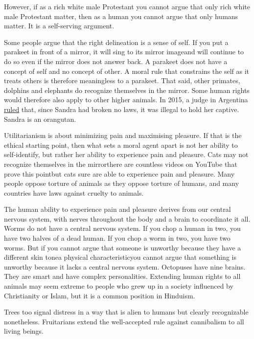 However, if as a rich white male Protestant you cannot argue that only rich white male Protestant matter, then as a human you cannot argue that only humans matter. It is a self-serving argument.

Some people argue that the right delineation is a sense of self. If you put a parakeet in front of a mirror, it will sing to its mirror image\textemdash and will continue to do so even if the mirror does not answer back. A parakeet does not have a concept of self and no concept of other. A moral rule that constrains the self as it treats others is therefore meaningless to a parakeet. That said, other primates, dolphins and elephants do recognize themselves in the mirror. Some human rights would therefore also apply to other higher animals. In 2015, a judge in Argentina \href{https://edition.cnn.com/2014/12/23/world/americas/feat-orangutan-rights-ruling/}{ruled} that, since Sandra had broken no laws, it was illegal to hold her captive. Sandra is an orangutan.

Utilitarianism is about minimizing pain and maximising pleasure. If that is the ethical starting point, then what sets a moral agent apart is not her ability to self-identify, but rather her ability to experience pain and pleasure. Cats may not recognize themselves in the mirror\textemdash there are countless videos on YouTube that prove this point\textemdash but cats sure are able to experience pain and pleasure. Many people oppose torture of animals as they oppose torture of humans, and many countries have laws against cruelty to animals.

The human ability to experience pain and pleasure derives from our central nervous system, with nerves throughout the body and a brain to coordinate it all. Worms do not have a central nervous system. If you chop a human in two, you have two halves of a dead human. If you chop a worm in two, you have two worms. But if you cannot argue that someone is unworthy because they have a different skin tone\textemdash a physical characteristic\textemdash you cannot argue that something is unworthy because it lacks a central nervous system. Octopuses have nine brains. They are smart and have complex personalities. Extending human rights to all animals may seem extreme to people who grew up in a society influenced by Christianity or Islam, but it is a common position in Hinduism.

Trees too signal distress in a way that is alien to humans but clearly recognizable nonetheless. Fruitarians extend the well-accepted rule against cannibalism to all living beings.

